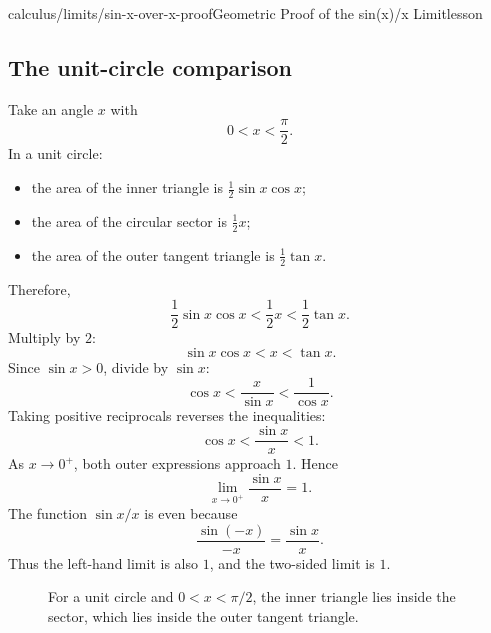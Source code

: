 \begin{webpage}{calculus/limits/sin-x-over-x-proof}{Geometric Proof of the sin(x)/x Limit}{lesson}
\subsection{The unit-circle comparison}

Take an angle \(x\) with
\[
  0<x<\frac{\pi}{2}.
\]
In a unit circle:

\begin{itemize}
  \item the area of the inner triangle is \(\frac12\sin x\cos x\);
  \item the area of the circular sector is \(\frac12x\);
  \item the area of the outer tangent triangle is \(\frac12\tan x\).
\end{itemize}

Therefore,
\[
  \frac12\sin x\cos x
  <\frac12x
  <\frac12\tan x.
\]
Multiply by \(2\):
\[
  \sin x\cos x<x<\tan x.
\]
Since \(\sin x>0\), divide by \(\sin x\):
\[
  \cos x<\frac{x}{\sin x}<\frac1{\cos x}.
\]
Taking positive reciprocals reverses the inequalities:
\[
  \cos x<\frac{\sin x}{x}<1.
\]
As \(x\to0^+\), both outer expressions approach \(1\). Hence
\[
  \lim_{x\to0^+}\frac{\sin x}{x}=1.
\]
The function \(\sin x/x\) is even because
\[
  \frac{\sin(-x)}{-x}=\frac{\sin x}{x}.
\]
Thus the left-hand limit is also \(1\), and the two-sided limit is \(1\).

\begin{figure}[htbp]
\centering
{}
\caption{For a unit circle and \(0<x<\pi/2\), the inner triangle lies inside the sector, which lies inside the outer tangent triangle.}
\label{fig:unit-circle-squeeze}
\end{figure}


\end{webpage}

